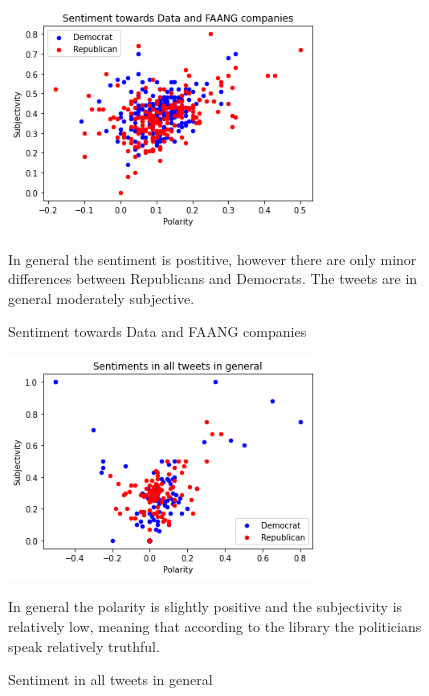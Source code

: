 	\begin{figure}[ht]
		\centering
		\includegraphics[width=0.73\textwidth]{images/appendix/KENNY3}
		\caption{\label{fig:kenny3}Sentiment towards Data and FAANG companies}{In general the sentiment is postitive, however there are only minor differences between Republicans and Democrats. The tweets are in general moderately subjective.}
	\end{figure}
	
	
		\begin{figure}[ht]
		\centering
		\includegraphics[width=0.73\textwidth]{images/appendix/KENNY4}
		\caption{\label{fig:kenny4}Sentiment in all tweets in general}{In general the polarity is slightly positive and the subjectivity is relatively low, meaning that according to the library the politicians speak relatively truthful.}
	\end{figure}
